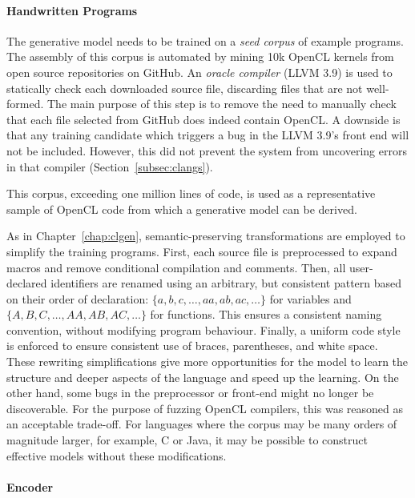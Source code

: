 \paragraph*{Handwritten Programs}

The generative model needs to be trained on a \emph{seed corpus} of example programs. The assembly of this corpus is automated by mining 10k OpenCL kernels from open source repositories on GitHub. An \emph{oracle compiler} (LLVM 3.9) is used to statically check each downloaded source file, discarding files that are not well-formed. The main purpose of this step is to remove the need to manually check that each file selected from GitHub does indeed contain OpenCL. A downside is that any training candidate which triggers a bug in the LLVM 3.9's front end will not be included. However, this did not prevent the system from uncovering errors in that compiler (Section~\ref{subsec:clangs}).

This corpus, exceeding one million lines of code, is used as a representative sample of OpenCL code from which a generative model can be derived.

As in Chapter~\ref{chap:clgen}, semantic-preserving transformations are employed to simplify the training programs. First, each source file is preprocessed to expand macros and remove conditional compilation and comments. Then, all user-declared identifiers are renamed using an arbitrary, but consistent pattern based on their order of declaration: $\{a,\allowbreak b,\allowbreak c,\allowbreak \ldots,\allowbreak aa,\allowbreak ab,\allowbreak ac,\allowbreak \ldots\}$ for variables and $\{A,\allowbreak B,\allowbreak C,\allowbreak \ldots,\allowbreak AA,\allowbreak AB,\allowbreak AC,\allowbreak \ldots\}$ for functions. This ensures a consistent naming convention, without modifying program behaviour. Finally, a uniform code style is enforced to ensure consistent use of braces, parentheses, and white space. These rewriting simplifications give more opportunities for the model to learn the structure and deeper aspects of the language and speed up the learning. On the other hand, some bugs in the preprocessor or front-end might no longer be discoverable. For the purpose of fuzzing OpenCL compilers, this was reasoned as an acceptable trade-off. For languages where the corpus may be many orders of magnitude larger, for example, C or Java, it may be possible to construct effective models without these modifications.


\paragraph*{Encoder}

